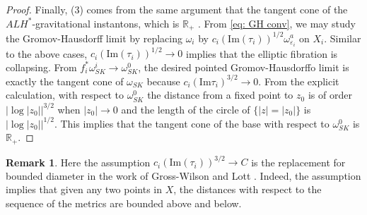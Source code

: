\documentclass[11pt]{amsart}
\theoremstyle{plain}
\theoremstyle{definition}
\newtheorem{rk}[thm]{Remark}
\numberwithin{equation}{section}
\renewcommand{\epsilon}{\varepsilon}
\begin{document}
\begin{proof}
    
   Finally, (3) comes from the same argument that the tangent cone of the $ALH^*$-gravitational instantons, which is $\mathbb{R}_+$ \cite[Theorem 1.5]{Hein}. From \eqref{eq: GH conv}, we may study the Gromov-Hausdorff limit by replacing $\omega_i$ by $c_i(\mbox{Im}(\tau_i))^{1/2}\omega^a_{\epsilon_i}$ on $X_i$. Similar to the above cases, $c_i(\mbox{Im}(\tau_i))^{1/2}\rightarrow 0$ implies that the elliptic fibration is collapsing. From $f_i^*\omega^i_{SK}\rightarrow \omega^0_{SK}$, the desired pointed Gromov-Hausdorffo limit is exactly the tangent cone of $\omega_{SK}$ because $c_i (\mbox{Im}\tau_i)^{3/2}\rightarrow 0$. From the explicit calculation, with respect to $\omega^0_{SK}$ the distance from a fixed point to $z_0$ is of order $|\log{|z_0|}|^{3/2}$ when $|z_0|\rightarrow 0$ and the length of the circle of $\{|z|=|z_0|\}$ is $|\log{|z_0|}|^{1/2}$. This implies that the tangent cone of the base with respect to $\omega^0_{SK}$ is $\mathbb{R}_+$. 
   
\end{proof}
\begin{rk}
	 Here the assumption $c_i(\mbox{Im}(\tau_i))^{3/2}\rightarrow C$ is the replacement for bounded diameter in the work of Gross-Wilson \cite{GW} and Lott \cite{L}. Indeed, the assumption implies that given any two points in $X$, the distances with respect to the sequence of the metrics are bounded above and below.
\end{rk}
\end{document}
